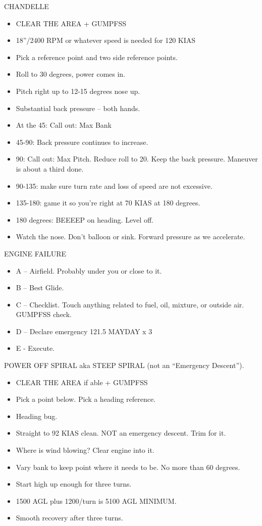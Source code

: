 CHANDELLE
\begin{itemize}
    \item CLEAR THE AREA + GUMPFSS
    \item 18”/2400 RPM or whatever speed is needed for 120 KIAS
    \item Pick a reference point and two side reference points.
    \item Roll to 30 degrees, power comes in.
    \item Pitch right up to 12-15 degrees nose up.
    \item Substantial back pressure – both hands.
    \item At the 45: Call out: Max Bank
    \item 45-90: Back pressure continues to increase.
    \item 90: Call out: Max Pitch. Reduce roll to 20. Keep the back pressure. Maneuver is about a third done.
    \item 90-135: make sure turn rate and loss of speed are not excessive.
    \item 135-180: game it so you’re right at 70 KIAS at 180 degrees.
    \item 180 degrees: BEEEEP on heading. Level off.
    \item Watch the nose. Don’t balloon or sink. Forward pressure as we accelerate.
\end{itemize}

ENGINE FAILURE
\begin{itemize}
    \item A – Airfield. Probably under you or close to it.
    \item B – Best Glide.
    \item C – Checklist. Touch anything related to fuel, oil, mixture, or outside air. GUMPFSS check.
    \item D – Declare emergency 121.5 MAYDAY x 3
    \item E - Execute.
\end{itemize}

POWER OFF SPIRAL aka STEEP SPIRAL (not an ``Emergency Descent'').
\begin{itemize}
    \item CLEAR THE AREA if able + GUMPFSS
    \item Pick a point below. Pick a heading reference.
    \item Heading bug.
    \item Straight to 92 KIAS clean. NOT an emergency descent. Trim for it.
    \item Where is wind blowing? Clear engine into it.
    \item Vary bank to keep point where it needs to be. No more than 60 degrees.
    \item Start high up enough for three turns.
    \item 1500 AGL plus 1200/turn is 5100 AGL MINIMUM.
    \item Smooth recovery after three turns.
\end{itemize}

